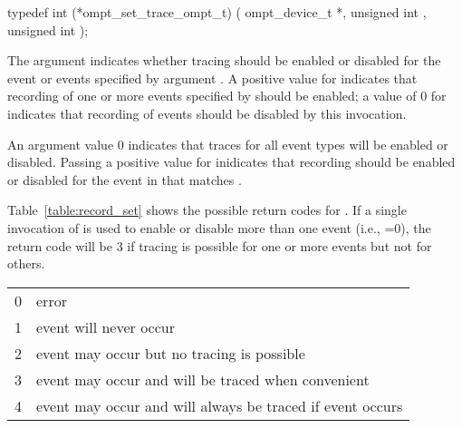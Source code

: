 \format
\begin{ccppspecific}
\begin{omptInquiry}
typedef int (*ompt_set_trace_ompt_t) (
  ompt_device_t *,
  unsigned int ,
  unsigned int 
);
\end{omptInquiry}
\end{ccppspecific}

\argdesc

\devicedesc

The argument  indicates whether tracing should be
enabled or disabled for the event or events specified by
argument . A positive value for 
indicates that recording of one or more events specified by
 should be enabled; a value of 0 for  indicates
that recording of events should be disabled by this invocation.

An argument  value 0 indicates that traces for all
event types will be enabled or disabled.  Passing a positive value for
 inidicates that recording should be enabled or disabled
for the event in  that matches .


\effect

Table~\ref{table:record_set} shows the possible return
codes for .  If a single invocation
of  is used to enable or disable
more than one event (i.e., =0), the return code will
be 3 if tracing is possible for one or more events but not for
others.

\nolinenumbers
\renewcommand{\arraystretch}{1.5}
\tablelasttail{\hline}
\begin{supertabular}{p{2.0in} p{3.0in}}
0 & error\\
1 & event will never occur\\
2 & event may occur but no tracing is possible\\
3 & event may occur and will be traced when convenient\\
4 & event may occur and will always be traced if event occurs\\
\end{supertabular}

